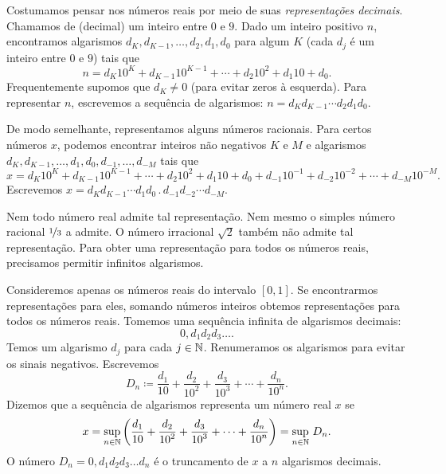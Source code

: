 
Costumamos pensar nos números reais por meio de suas
\emph{representações decimais}.
Chamamos de (decimal)
\emph{} um inteiro
entre $0$ e $9$.
Dado um inteiro positivo $n$, encontramos algarismos $d_K,d_{K-1},\ldots,d_2,d_1,d_0$ para algum
$K$ (cada $d_j$ é um inteiro entre $0$ e $9$) tais que
\begin{equation*}
n = d_K {10}^K + d_{K-1} {10}^{K-1} + \cdots + d_2 {10}^2 + d_1 10 + d_0 .
\end{equation*}
Frequentemente supomos que $d_K \neq 0$ (para evitar zeros à esquerda).
Para representar $n$, escrevemos a sequência de
algarismos: $n = d_K d_{K-1} \cdots d_2 d_1 d_0$.

De modo semelhante, representamos alguns números racionais. Para certos
números $x$, podemos encontrar
inteiros não negativos $K$ e $M$ e algarismos
$d_K,d_{K-1},\ldots,d_1,d_0,d_{-1},\ldots,d_{-M}$ tais que
\begin{equation*}
x
= d_K {10}^K + d_{K-1} {10}^{K-1} + \cdots + d_2 {10}^2 + d_1 10 + d_0
+ d_{-1} {10}^{-1} + d_{-2} {10}^{-2} + \cdots + d_{-M} {10}^{-M} .
\end{equation*}
Escrevemos $x = d_K d_{K-1} \cdots d_1 d_0 \, . \, d_{-1} d_{-2} \cdots d_{-M}$.

Nem todo número real admite tal representação.
Nem mesmo o simples
número racional $\nicefrac{1}{3}$ a admite. O número irracional $\sqrt{2}$
também não admite tal representação. Para obter uma representação para
todos os números reais, precisamos permitir infinitos algarismos.

Consideremos apenas os números reais do intervalo $[0,1]$. Se
encontrarmos representações para eles, somando
números inteiros obtemos representações para todos os números reais.
Tomemos uma sequência infinita de algarismos decimais:
\begin{equation*}
0{,}d_1d_2d_3\ldots.
\end{equation*}
Temos um algarismo $d_j$ para cada $j \in {\mathbb{N}}$.
Renumeramos os algarismos para evitar os sinais negativos.
Escrevemos
\begin{equation*}
D_n \coloneqq
\frac{d_1}{10} +
\frac{d_2}{{10}^2} +
\frac{d_3}{{10}^3} +
\cdots +
\frac{d_n}{{10}^n} .
\end{equation*}
Dizemos que a
sequência de algarismos representa um número real $x$ se
\begin{equation*}
x =
\sup_{n \in {\mathbb{N}}} \left(
\frac{d_1}{10} +
\frac{d_2}{{10}^2} +
\frac{d_3}{{10}^3} +
\cdots +
\frac{d_n}{{10}^n}
\right) =
\sup_{n \in {\mathbb{N}}} \, D_n .
\end{equation*}
O número $D_n=0{,}d_1 d_2 d_3 \ldots d_n$ é o truncamento de $x$
a $n$ algarismos decimais.

